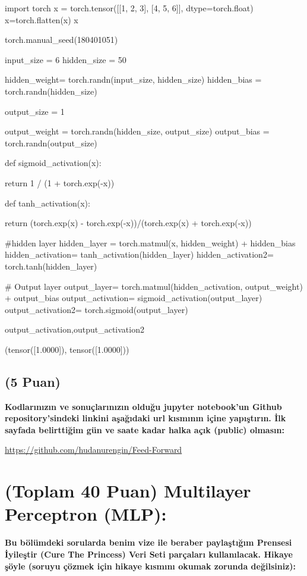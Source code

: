 \documentclass[11pt]{article}
\begin{document}
\begin{python}
import torch
x = torch.tensor([[1, 2, 3], [4, 5, 6]], dtype=torch.float)
x=torch.flatten(x)
x

torch.manual_seed(180401051)

input_size = 6
hidden_size = 50

hidden_weight= torch.randn(input_size, hidden_size)
hidden_bias = torch.randn(hidden_size)

output_size = 1

output_weight = torch.randn(hidden_size, output_size)
output_bias = torch.randn(output_size)

def sigmoid_activation(x):

  return 1 / (1 + torch.exp(-x))

def tanh_activation(x):

    return (torch.exp(x) - torch.exp(-x))/(torch.exp(x) + torch.exp(-x))

#hidden layer
hidden_layer = torch.matmul(x, hidden_weight) + hidden_bias
hidden_activation= tanh_activation(hidden_layer)
hidden_activation2= torch.tanh(hidden_layer)

# Output layer
output_layer= torch.matmul(hidden_activation, output_weight) + output_bias
output_activation= sigmoid_activation(output_layer)
output_activation2= torch.sigmoid(output_layer)

output_activation,output_activation2
\end{python}

(tensor([1.0000]), tensor([1.0000]))

\subsection{(5 Puan)} \textbf{Kodlarınızın ve sonuçlarınızın olduğu jupyter notebook'un Github repository'sindeki linkini aşağıdaki url kısmının içine yapıştırın. İlk sayfada belirttiğim gün ve saate kadar halka açık (public) olmasın:}

\url{https://github.com/hudanurengin/Feed-Forward}

\section{(Toplam 40 Puan) Multilayer Perceptron (MLP):} 
\textbf{Bu bölümdeki sorularda benim vize ile beraber paylaştığım Prensesi İyileştir (Cure The Princess) Veri Seti parçaları kullanılacak. Hikaye şöyle (soruyu çözmek için hikaye kısmını okumak zorunda değilsiniz):} 
\end{document}
